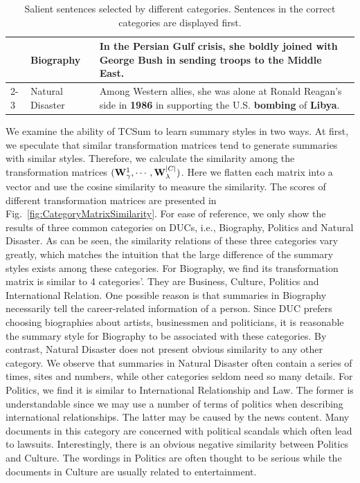 \documentclass[letterpaper]{article}
\begin{document}
\begin{table}[t]
\begin{tabular}{l|l|p{11cm}}
& Biography        & In the Persian Gulf crisis, she \textbf{boldly} joined with George Bush in sending troops to the Middle East.                                                                       \\ \cline{2-3}
& Natural Disaster & Among Western allies, she was alone at Ronald Reagan's side in \textbf{1986} in supporting the U.S. \textbf{bombing} of \textbf{Libya}.                                                               \\ \hline
\end{tabular}
\caption{Salient sentences selected by different categories. Sentences in the correct categories are displayed first.}
\label{tb:summaryWithCategory}
\end{table}

We examine the ability of TCSum to learn summary styles in two ways.
At first, we speculate that similar transformation matrices tend to generate summaries with similar styles.
Therefore, we calculate the similarity among the transformation matrices $({\bf{W}}_\gamma ^1, \cdots ,{\bf{W}}_\lambda ^{|C|})$.
Here we flatten each matrix into a vector and use the cosine similarity to measure the similarity.
The scores of different transformation matrices are presented in Fig.~\ref{fig:CategoryMatrixSimilarity}.
For ease of reference, we only show the results of three common categories on DUCs, i.e., Biography, Politics and Natural Disaster.
As can be seen, the similarity relations of these three categories vary greatly, which matches the intuition that the large difference of the summary styles exists among these categories.
For Biography, we find its transformation matrix is similar to 4 categories'. They are Business, Culture, Politics and International Relation.
One possible reason is that summaries in Biography necessarily tell the career-related information of a person.
Since DUC prefers choosing biographies about artists, businessmen and politicians, it is reasonable the summary style for Biography to be associated with these categories.
By contrast, Natural Disaster does not present obvious similarity to any other category.
We observe that summaries in Natural Disaster often contain a series of times, sites and numbers, while other categories seldom need so many details.
For Politics, we find it is similar to International Relationship and Law.
The former is understandable since we may use a number of terms of politics when describing international relationships.
The latter may be caused by the news content.
Many documents in this category are concerned with political scandals which often lead to lawsuits.
Interestingly, there is an obvious negative similarity between Politics and Culture.
The wordings in Politics are often thought to be serious while the documents in Culture are usually related to entertainment.
\end{document}
